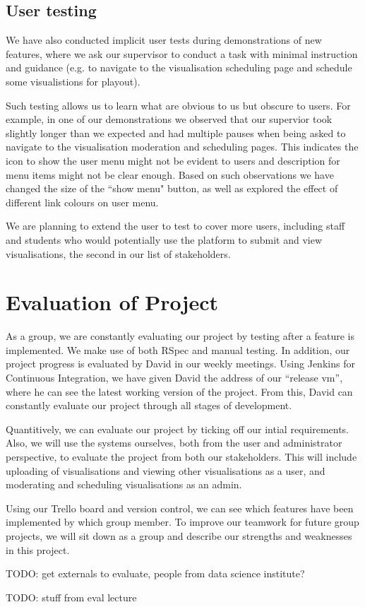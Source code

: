 \documentclass[a4paper]{article}
\begin{document}
\subsection{User testing}
We have also conducted implicit user tests during demonstrations of new features,
where we ask our supervisor to conduct a task with minimal instruction and guidance
(e.g. to navigate to the visualisation scheduling page and schedule some visualistions
for playout).

Such testing allows us to learn what are obvious to us but obscure to users.
For example, in one of our demonstrations we observed that our supervior 
took slightly longer than we expected and had multiple pauses when
being asked to navigate to the visualisation moderation and scheduling pages. This 
indicates the icon to show the user menu might not be evident to users and
description for menu items might not be clear enough. Based on such observations
we have changed the size of the ``show menu" button, as well as explored the effect
of different link colours on user menu.

We are planning to extend the user to test to cover more users, including staff
and students who would potentially use the platform to submit and view visualisations, the second in our list of stakeholders.

\section{Evaluation of Project}
As a group, we are constantly evaluating our project by testing after a 
feature is implemented. We make use of both RSpec and manual testing. In 
addition, our project progress is evaluated by David in our weekly 
meetings. Using Jenkins for Continuous Integration, we have given David
the address of our ``release vm'', where he can see the latest working 
version of the project. From this, David can constantly evaluate our project 
through all stages of development.

Quantitively, we can evaluate our project by ticking off our intial 
requirements. Also, we will use the systems ourselves, both from the user 
and administrator perspective, to evaluate the project from both our stakeholders.
This will include uploading of visualisations and viewing other visualisations as a
user, and moderating and scheduling visualisations as an admin.

Using our Trello board and version control, we can see which features have been 
implemented by which group member. To improve our teamwork for future group 
projects, we will sit down as a group and describe our strengths and weaknesses in 
this project.

TODO: get externals to evaluate, people from data science institute? 

TODO: stuff from eval lecture
\end{document}
